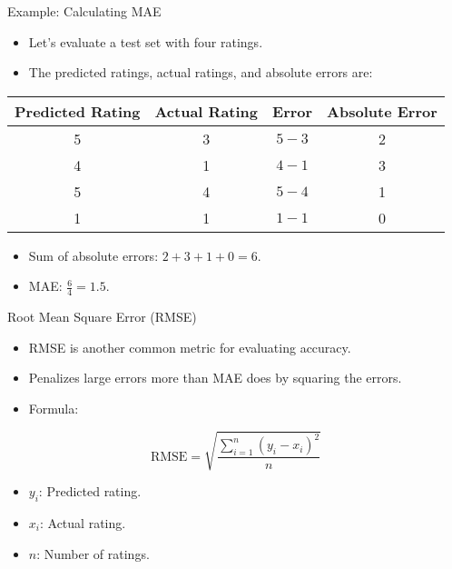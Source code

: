 \documentclass{beamer}
\begin{document}
\begin{frame}{Example: Calculating MAE}
\begin{itemize}
    \item Let's evaluate a test set with four ratings.
    \item The predicted ratings, actual ratings, and absolute errors are:
\end{itemize}

\begin{center}
\begin{tabular}{|c|c|c|c|}
\hline
\textbf{Predicted Rating} & \textbf{Actual Rating} & \textbf{Error} & \textbf{Absolute Error} \\ \hline
5 & 3 & \( 5 - 3 \) & 2 \\ \hline
4 & 1 & \( 4 - 1 \) & 3 \\ \hline
5 & 4 & \( 5 - 4 \) & 1 \\ \hline
1 & 1 & \( 1 - 1 \) & 0 \\ \hline
\end{tabular}
\end{center}

\begin{itemize}
    \item Sum of absolute errors: \( 2 + 3 + 1 + 0 = 6 \).
    \item MAE: \( \frac{6}{4} = 1.5 \).
\end{itemize}
\end{frame}

\begin{frame}{Root Mean Square Error (RMSE)}
\begin{itemize}
    \item RMSE is another common metric for evaluating accuracy.
    \item Penalizes large errors more than MAE does by squaring the errors.
    \item Formula:
\end{itemize}
\[
\text{RMSE} = \sqrt{\frac{\sum_{i=1}^{n} \left( y_i - x_i \right)^2}{n}}
\]
\begin{itemize}
    \item \( y_i \): Predicted rating.
    \item \( x_i \): Actual rating.
    \item \( n \): Number of ratings.
\end{itemize}
\end{frame}
\end{document}
